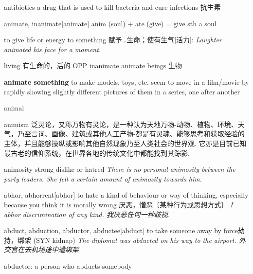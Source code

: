 \begin{DefWord}{antibiotics}
    a drug that is used to kill bacteria and cure infections 抗生素
\end{DefWord}

\begin{DefWord}{animate, inanimate}[animate]
    anim (soul) + ate (give) = give sth a soul

    to give life or energy to something 赋予…生命；使有生气[活力]:
    \textit{Laughter animated his face for a moment.}

    living 有生命的，活的 OPP  inanimate
    animate beings 生物 

    \textbf{animate something} to make models, toys, etc. seem to move in a film/movie by rapidly showing slightly different pictures of them in a series, one after another
\end{DefWord}

\begin{DefWord}{animal}
\end{DefWord}

\begin{DefWord}{animism}
    泛灵论，又称万物有灵论，是一种认为天地万物-动物、植物、环境、天气，乃至言词、画像、建筑或其他人工产物-都是有灵魂、能够思考和获取经验的主体，并且能够操纵或影响其他自然现象乃至人类社会的世界观. 它亦是目前已知最古老的信仰系统，在世界各地的传统文化中都能找到其踪影. 
\end{DefWord}

\begin{DefWord}{animosity}
    strong dislike or hatred
    \textit{There is no personal animosity between the party leaders. She felt a certain amount of animosity towards him.}
\end{DefWord}

\begin{DefWord}{abhor, abhorrent}[abhor]
    to hate a kind of behaviour or way of thinking, especially because you think it is morally wrong 厌恶，憎恶〔某种行为或思想方式〕
 \textit{I abhor discrimination of any kind. 我厌恶任何一种歧视. }
\end{DefWord}

\begin{DefWord}{abduct, abduction, abductor, abductee}[abduct]
    to take someone away by force劫持，绑架 (SYN  kidnap)
    \textit{The diplomat was abducted on his way to the airport.  外交官在去机场途中遭绑架. }

    abductor: a person who abducts somebody
\end{DefWord}